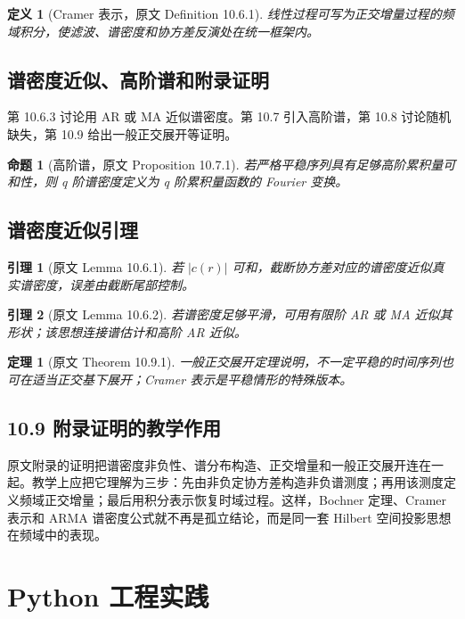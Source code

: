 \documentclass[11pt,a4paper]{ctexart}
\newtheorem{definition}{定义}[section]
\newtheorem{theorem}{定理}[section]
\newtheorem{lemma}{引理}[section]
\newtheorem{proposition}{命题}[section]
\begin{document}
\begin{definition}[Cramer 表示，原文 Definition 10.6.1]
线性过程可写为正交增量过程的频域积分，使滤波、谱密度和协方差反演处在统一框架内。
\end{definition}

\subsection{谱密度近似、高阶谱和附录证明}
第 10.6.3 讨论用 AR 或 MA 近似谱密度。第 10.7 引入高阶谱，第 10.8 讨论随机缺失，第 10.9 给出一般正交展开等证明。

\begin{proposition}[高阶谱，原文 Proposition 10.7.1]
若严格平稳序列具有足够高阶累积量可和性，则 q 阶谱密度定义为 q 阶累积量函数的 Fourier 变换。
\end{proposition}

\subsection{谱密度近似引理}
\begin{lemma}[原文 Lemma 10.6.1]
若 \(|c(r)|\) 可和，截断协方差对应的谱密度近似真实谱密度，误差由截断尾部控制。
\end{lemma}

\begin{lemma}[原文 Lemma 10.6.2]
若谱密度足够平滑，可用有限阶 AR 或 MA 近似其形状；该思想连接谱估计和高阶 AR 近似。
\end{lemma}

\begin{theorem}[原文 Theorem 10.9.1]
一般正交展开定理说明，不一定平稳的时间序列也可在适当正交基下展开；Cramer 表示是平稳情形的特殊版本。
\end{theorem}

\subsection{10.9 附录证明的教学作用}
原文附录的证明把谱密度非负性、谱分布构造、正交增量和一般正交展开连在一起。教学上应把它理解为三步：先由非负定协方差构造非负谱测度；再用该测度定义频域正交增量；最后用积分表示恢复时域过程。这样，Bochner 定理、Cramer 表示和 ARMA 谱密度公式就不再是孤立结论，而是同一套 Hilbert 空间投影思想在频域中的表现。

\section{Python 工程实践}
\end{document}

